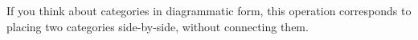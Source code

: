 \begin{ctdefinition}
\end{ctdefinition}

\begin{remark}
    If you think about categories in diagrammatic form, this operation corresponds to placing two categories side-by-side, without connecting them.
\end{remark}

